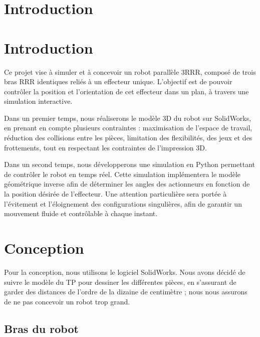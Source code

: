 \documentclass[a4paper, 11pt]{report}
\begin{document}

\clearpage\setcounter{page}{2}

\tableofcontents

\section*{Introduction}

\section*{Introduction}

Ce projet vise à simuler et à concevoir un robot parallèle 3RRR, composé de trois bras RRR identiques reliés à un effecteur unique. L'objectif est de pouvoir contrôler la position et l'orientation de cet effecteur dans un plan, à travers une simulation interactive.

Dans un premier temps, nous réaliserons le modèle 3D du robot sur SolidWorks, en prenant en compte plusieurs contraintes : maximisation de l'espace de travail, réduction des collisions entre les pièces, limitation des flexibilités, des jeux et des frottements, tout en respectant les contraintes de l'impression 3D.

Dans un second temps, nous développerons une simulation en Python permettant de contrôler le robot en temps réel. Cette simulation implémentera le modèle géométrique inverse afin de déterminer les angles des actionneurs en fonction de la position désirée de l'effecteur. Une attention particulière sera portée à l'évitement et l'éloignement des configurations singulières, afin de garantir un mouvement fluide et contrôlable à chaque instant.

\section{Conception}

Pour la conception, nous utilisons le logiciel SolidWorks. Nous avons décidé de suivre le modèle du TP pour dessiner les différentes pièces, 
en s'assurant de garder des distances de l'ordre de la dizaine de centimètre ; nous nous assurons de ne pas concevoir un robot trop grand.

\subsection{Bras du robot}
\end{document}
